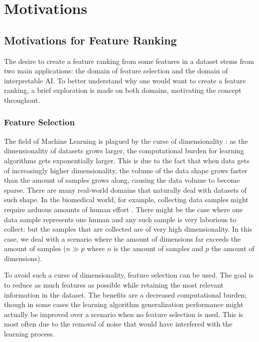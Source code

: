 \documentclass[../main.tex]{subfiles}
\begin{document}
\section{Motivations}\label{section:motivations}


\subsection{Motivations for Feature Ranking}
The desire to create a feature ranking from some features in a dataset stems from two main applications: the domain of feature selection and the domain of interpretable AI. To better understand why one would want to create a feature ranking, a brief exploration is made on both domains, motivating the concept throughout.



\subsubsection{Feature Selection}
The field of Machine Learning is plagued by the curse of dimensionality \citep{koppen_curse_2009}: as the dimensionality of datasets grows larger, the computational burden for learning algorithms gets exponentially larger. This is due to the fact that when data gets of increasingly higher dimensionality, the volume of the data shape grows faster than the amount of samples grows along, causing the data volume to become sparse.
There are many real-world domains that naturally deal with datasets of such shape. In the biomedical world, for example, collecting data samples might require arduous amounts of human effort \citep{hu_feature_2018}. There might be the case where one data sample represents one human and any such sample is very laborious to collect: but the samples that are collected are of very high dimensionality. In this case, we deal with a scenario where the amount of dimensions far exceeds the amount of samples ($n \gg p$ where $n$ is the amount of samples and $p$ the amount of dimensions).

To avoid such a curse of dimensionality, feature selection can be used. The goal is to reduce as much features as possible while retaining the most relevant information in the dataset. The benefits are a decreased computational burden; though in some cases the learning algorithm generalization performance might actually be improved over a scenario when no feature selection is used. This is most often due to the removal of noise that would have interfered with the learning process.
\end{document}

